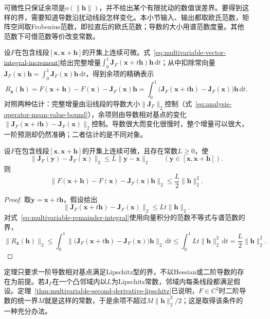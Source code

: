 可微性只保证余项是$o(\lVert\bm h\rVert)$，并不给出某个有限扰动的数值误差界。要得到这样的界，需要知道导数沿扰动线段怎样变化。本小节输入、输出都取欧氏范数，矩阵空间取Frobenius范数，即拉直后的欧氏范数；导数的大小用谱范数度量。其他范数下可借范数等价改变常数。

设$F$在包含线段$[\bm x,\bm x+\bm h]$的开集上连续可微。式~\eqref{eq:multivariable-vector-integral-increment}给出完整增量$\int_0^1\bm J_F(\bm x+t\bm h)\bm h\,\mathrm dt$；从中扣除常向量$\bm J_F(\bm x)\bm h=\int_0^1\bm J_F(\bm x)\bm h\,\mathrm dt$，得到余项的精确表示
\begin{equation}
 R_{\bm x}(\bm h)=F(\bm x+\bm h)-F(\bm x)-\bm J_F(\bm x)\bm h
 =\int_0^1\bigl(\bm J_F(\bm x+t\bm h)-\bm J_F(\bm x)\bigr)\bm h\,\mathrm dt .
\label{eq:multivariable-remainder-integral}
\end{equation}
对照两种估计：完整增量由沿线段的导数大小$\lVert\bm J_F\rVert_2$控制（式~\eqref{eq:analysis-operator-mean-value-bound}），余项则由导数相对基点的变化$\lVert\bm J_F(\bm x+t\bm h)-\bm J_F(\bm x)\rVert_2$控制。导数很大而变化很慢时，整个增量可以很大，一阶预测却仍然准确；二者估计的是不同对象。
\begin{theorem}[一阶近似的二次余项界]
\label{thm:multivariable-first-order-remainder-bound}
设$F$在包含线段$[\bm x,\bm x+\bm h]$的开集上连续可微，且存在常数$L\geq0$，使
\[
 \lVert\bm J_F(\bm y)-\bm J_F(\bm x)\rVert_2\leq L\lVert\bm y-\bm x\rVert_2\qquad(\bm y\in[\bm x,\bm x+\bm h]).
\]
则
\begin{equation}
 \lVert F(\bm x+\bm h)-F(\bm x)-\bm J_F(\bm x)\bm h\rVert_2\leq\frac L2\lVert\bm h\rVert_2^2 .
\label{eq:multivariable-first-order-remainder-bound}
\end{equation}
\end{theorem}
\begin{proof}
取$\bm y=\bm x+t\bm h$，假设给出
\[
 \lVert\bm J_F(\bm x+t\bm h)-\bm J_F(\bm x)\rVert_2\leq Lt\lVert\bm h\rVert_2 .
\]
对式~\eqref{eq:multivariable-remainder-integral}使用向量积分的范数不等式与谱范数的界，
\[
 \lVert R_{\bm x}(\bm h)\rVert_2
 \leq\int_0^1\bigl\lVert\bigl(\bm J_F(\bm x+t\bm h)-\bm J_F(\bm x)\bigr)\bm h\bigr\rVert_2\,\mathrm dt
 \leq\int_0^1Lt\lVert\bm h\rVert_2^2\,\mathrm dt=\frac L2\lVert\bm h\rVert_2^2 .
\]
\end{proof}
定理只要求一阶导数相对基点满足Lipschitz型的界，不以Hessian或二阶导数的存在为前提。若$\bm J_F$在一个凸邻域内以$L$为Lipschitz常数，邻域内每条线段都满足假设。定理~\ref{thm:multivariable-second-derivative-lipschitz}已说明，$F\in C^2$时二阶导数的统一界$M$就是这样的常数，于是余项不超过$M\lVert\bm h\rVert_2^2/2$；这是取得该条件的一种充分办法。

